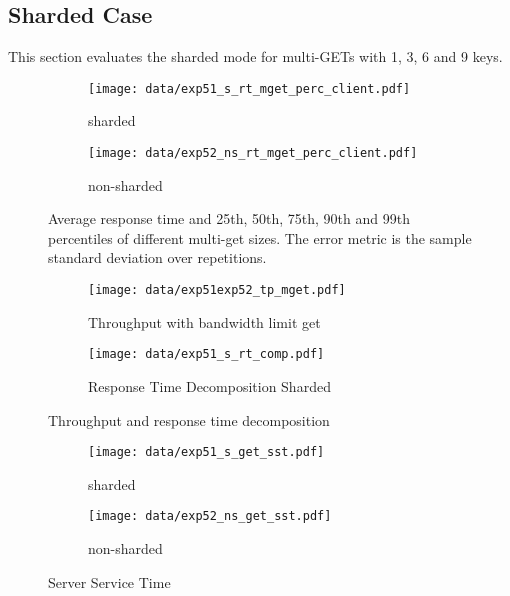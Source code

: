 \documentclass[report.tex]{subfiles}
\begin{document}
\subsection{Sharded Case}

This section evaluates the sharded mode for multi-GETs with 1, 3, 6 and 9 keys.


\begin{figure}
	\begin{subfigure}[b]{.49\linewidth}
		\centering
		\texttt{[image: data/exp51\_s\_rt\_mget\_perc\_client.pdf]}
		\caption{sharded}\label{exp51_s_rt_mget_perc}
	\end{subfigure}\hfill
	\begin{subfigure}[b]{.49\linewidth}
		\centering
		\texttt{[image: data/exp52\_ns\_rt\_mget\_perc\_client.pdf]}
		\caption{non-sharded}\label{exp52_ns_rt_mget_perc}
	\end{subfigure}%
	\caption{Average response time and 25th, 50th, 75th, 90th and 99th percentiles of different multi-get sizes. The error metric is the sample standard deviation over repetitions.}\label{exp5_rt_mget_perc}
\end{figure}

\begin{figure}
	\begin{subfigure}[b]{.49\linewidth}
		\centering
		\texttt{[image: data/exp51exp52\_tp\_mget.pdf]}
		\caption{Throughput with bandwidth limit get}\label{exp5_tp}
	\end{subfigure}\hfill
	\begin{subfigure}[b]{.49\linewidth}
		\centering
		\texttt{[image: data/exp51\_s\_rt\_comp.pdf]}
		\caption{Response Time Decomposition Sharded}\label{exp51_s_rt_comp}
	\end{subfigure}%
	\caption{Throughput and response time decomposition}
\end{figure}


\begin{figure}
	\begin{subfigure}[b]{.49\linewidth}
		\centering
		\texttt{[image: data/exp51\_s\_get\_sst.pdf]}
		\caption{sharded}\label{exp51_s_get_sst}
	\end{subfigure}\hfill
	\begin{subfigure}[b]{.49\linewidth}
		\centering
		\texttt{[image: data/exp52\_ns\_get\_sst.pdf]}
		\caption{non-sharded}\label{exp52_s_get_sst}
	\end{subfigure}%
	\caption{Server Service Time}
\end{figure}
\end{document}
